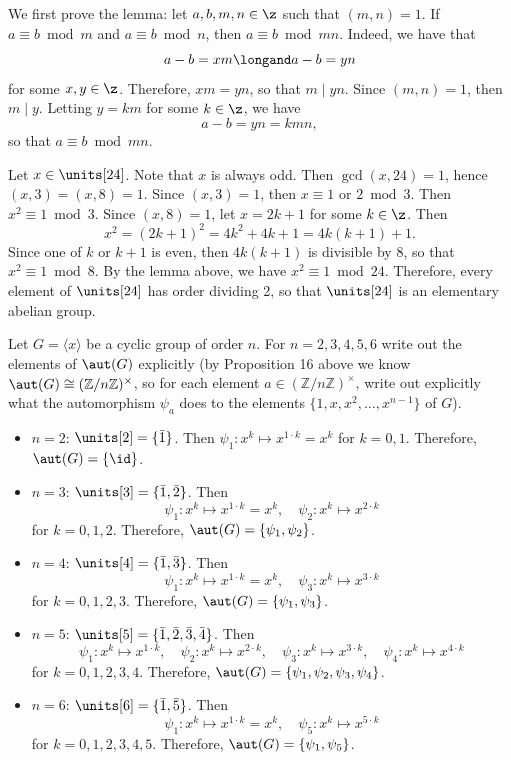 \begin{sol}
	We first prove the lemma: let $a, b, m, n \in \z$ such that $(m, n) = 1$. If $a \equiv b \bmod m$ and $a \equiv b \bmod n$, then $a \equiv b \bmod{mn}$. Indeed, we have that
	\[a - b = xm \longand a - b = yn\]
	for some $x, y \in \z$. Therefore, $xm = yn$, so that $m \mid yn$. Since $(m, n) = 1$, then $m \mid y$. Letting $y = km$ for some $k \in \z$, we have
	\[a - b = yn = kmn,\]
	so that $a \equiv b \bmod{mn}$.

	Let $x \in \units[24]$. Note that $x$ is always odd. Then $\gcd(x, 24) = 1$, hence $(x, 3) = (x, 8) = 1$. Since $(x, 3) = 1$, then $x \equiv 1$ or $2 \bmod 3$. Then $x^2 \equiv 1 \bmod 3$. Since $(x, 8) = 1$, let $x = 2k + 1$ for some $k \in \z$. Then
	\[x^2 = (2k + 1)^2 = 4k^2 + 4k + 1 = 4k(k + 1) + 1.\]
	Since one of $k$ or $k + 1$ is even, then $4k(k + 1)$ is divisible by 8, so that $x^2 \equiv 1 \bmod 8$. By the lemma above, we have $x^2 \equiv 1 \bmod 24$. Therefore, every element of $\units[24]$ has order dividing 2, so that $\units[24]$ is an elementary abelian group.
\end{sol}

\newpage

\begin{exercise}
	Let $G=\langle x\rangle$ be a cyclic group of order $n$. For $n=2,3,4,5,6$ write out the elements of $\aut(G)$ explicitly (by Proposition 16 above we know $\aut(G)\cong(\mathbb Z/n\mathbb Z)^\times$, so for each element $a\in(\mathbb Z/n\mathbb Z)^\times$, write out explicitly what the automorphism $\psi_a$ does to the elements $\{1,x,x^2,\ldots,x^{n-1}\}$ of $G$).
\end{exercise}

\begin{sol} \leavevmode
	\begin{itemize}
		\item $n = 2$: $\units[2] = \{\bar 1\}$. Then $\psi_1 : x^k \mapsto x^{1 \cdot k} = x^k$ for $k = 0, 1$. Therefore, $\aut(G) = \{\id\}$.
		\item $n = 3$: $\units[3] = \{\bar 1, \bar 2\}$. Then
		\[\psi_1 : x^k \mapsto x^{1 \cdot k} = x^k, \quad \psi_2 : x^k \mapsto x^{2 \cdot k}\]
		for $k = 0, 1, 2$. Therefore, $\aut(G) = \{\psi_1, \psi_2\}$.
		\item $n = 4$: $\units[4] = \{\bar 1, \bar 3\}$. Then
		\[\psi_1 : x^k \mapsto x^{1 \cdot k} = x^k, \quad \psi_3 : x^k \mapsto x^{3 \cdot k}\]
		for $k = 0, 1, 2, 3$. Therefore, $\aut(G) = \{\psi_1, \psi_3\}$.
		\item $n = 5$: $\units[5] = \{\bar 1, \bar 2, \bar 3, \bar 4\}$. Then
		\[\psi_1 : x^k \mapsto x^{1 \cdot k}, \quad \psi_2 : x^k \mapsto x^{2 \cdot k}, \quad \psi_3 : x^k \mapsto x^{3 \cdot k}, \quad \psi_4 : x^k \mapsto x^{4 \cdot k}\]
		for $k = 0, 1, 2, 3, 4$. Therefore, $\aut(G) = \{\psi_1, \psi_2, \psi_3, \psi_4\}$.
		\item $n = 6$: $\units[6] = \{\bar 1, \bar 5\}$. Then
		\[\psi_1 : x^k \mapsto x^{1 \cdot k} = x^k, \quad \psi_5 : x^k \mapsto x^{5 \cdot k}\]
		for $k = 0, 1, 2, 3, 4, 5$. Therefore, $\aut(G) = \{\psi_1, \psi_5\}$. \qh
	\end{itemize}
\end{sol}

